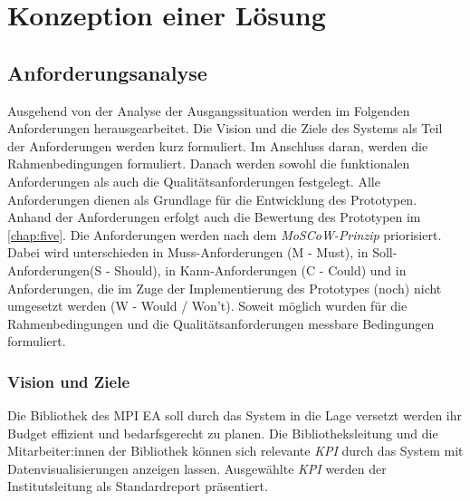 \chapter{Konzeption einer Lösung}
\label{chap:four}

\section{Anforderungsanalyse}
Ausgehend von der Analyse der Ausgangssituation werden im Folgenden 
Anforderungen herausgearbeitet. Die Vision und die Ziele des Systems als Teil der Anforderungen werden kurz formuliert. Im Anschluss daran,
werden die Rahmenbedingungen formuliert. Danach werden sowohl die funktionalen Anforderungen als
auch die Qualitätsanforderungen festgelegt. Alle Anforderungen dienen als Grundlage für die Entwicklung des Prototypen. 
Anhand der Anforderungen erfolgt auch die Bewertung des Prototypen im \autoref{chap:five}. 
Die Anforderungen werden nach dem \textit{MoSCoW-Prinzip} priorisiert. 
Dabei wird unterschieden in Muss-Anforderungen (M - Must), in Soll-Anforderungen(S - Should), in Kann-Anforderungen (C - Could) und in Anforderungen,
die im Zuge der Implementierung des Prototypes (noch) nicht umgesetzt werden (W - Would / Won't).
Soweit möglich wurden für die Rahmenbedingungen und die Qualitätsanforderungen messbare Bedingungen formuliert.
\subsection{Vision und Ziele}
Die Bibliothek des \acrshort{MPI EA} soll durch das System in die Lage versetzt werden ihr Budget effizient und bedarfsgerecht zu planen.
Die Bibliotheksleitung und die Mitarbeiter:innen der Bibliothek können sich relevante \textit{\acrshort{KPI}} durch das System mit
Datenvisualisierungen anzeigen lassen.
Ausgewählte \textit{\acrshort{KPI}} werden der Institutsleitung als Standardreport präsentiert.

